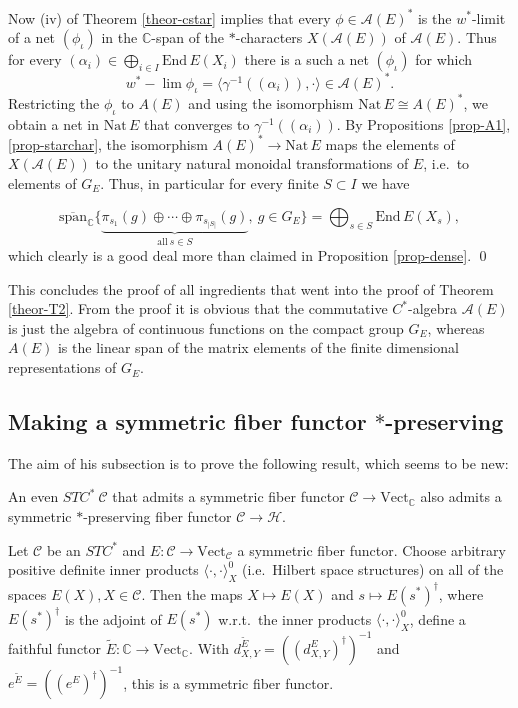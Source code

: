 \documentclass[12pt]{article}
\theoremstyle{definition}
\theoremstyle{definition}
\theoremstyle{remark}
\newcommand{\Vect}{\mathrm{Vect}}
\def\2#1{{\mathcal #1}}
\def\7#1{{\mathbb #1}}
\newcommand{\End}{\mathrm{End}}
\newcommand{\rarr}{\rightarrow}
\newcommand{\Nat}{\mathrm{Nat}}
\begin{document}
Now (iv) of Theorem \ref{theor-cstar} implies that every $\phi\in\2A(E)^*$ is the $w^*$-limit of a
net $(\phi_\iota)$ in the $\7C$-span of the $*$-characters $X(\2A(E))$ of $\2A(E)$.  Thus for every 
$(\alpha_i)\in\bigoplus_{i\in I}\End\,E(X_i)$ there is a such a net $(\phi_\iota)$ for which
\[ w^*-\lim \phi_\iota =
\langle\gamma^{-1}((\alpha_i)),\cdot\rangle\in\2A(E)^*. \] Restricting
the $\phi_\iota$ to $A(E)$ and using the isomorphism $\Nat\,E\cong
A(E)^*$, we obtain a net in $\Nat\,E$ that converges to
$\gamma^{-1}((\alpha_i))$. By Propositions \ref{prop-A1},
\ref{prop-starchar}, the isomorphism $A(E)^*\rarr\Nat\,E$ maps the
elements of $X(\2A(E))$ to the unitary natural monoidal
transformations of $E$, i.e.\ to elements of $G_E$.  Thus, in
particular for every finite $S\subset I$ we have

\[ \overline{\mathrm{span}} _{\7C} \{
  \underbrace{ \pi_{s_1}(g)\oplus\cdots\oplus\pi_{s_{|S|}}(g)}_{\mathrm{all}\
    s\in S},\ g\in G_E \}  = \bigoplus_{s\in S}\End\,E(X_s), \]
which clearly is a good deal more than claimed in Proposition
\ref{prop-dense}.  \qed

This concludes the proof of all ingredients that went into the proof
of Theorem \ref{theor-T2}. From the proof it is obvious that the
commutative $C^*$-algebra $\2A(E)$ is just the algebra of continuous
functions on the compact group $G_E$, whereas $A(E)$ is the linear
span of the matrix elements of the finite dimensional representations
of $G_E$.




\subsection{Making a symmetric fiber functor $*$-preserving} \label{ss-starpres}
The aim of his subsection is to prove the following result, which seems to be new:

\btheor \label{theor-F} An even $STC^*\ \2C$ that admits a symmetric
fiber functor $\2C\rarr\Vect_\7C$ also admits a symmetric
$*$-preserving fiber functor $\2C\rarr\2H$.  \etheor

\blemma Let $\2C$ be an $STC^*$ and $E:\2C\rarr\Vect_\2C$ a symmetric
fiber functor. Choose arbitrary positive definite inner products
$\langle\cdot,\cdot\rangle^0_X$ (i.e.\ Hilbert space structures) on
all of the spaces $E(X), X\in\2C$. Then the maps $X\mapsto E(X)$ and
$s\mapsto E(s^*)^\dagger$, where $E(s^*)^\dagger$ is the adjoint of
$E(s^*)$ w.r.t.\ the inner products $\langle\cdot,\cdot\rangle^0_X$,
define a faithful functor $\widetilde{E}:\7C\rarr\Vect_\7C$. With
$d^{\widetilde{E}}_{X,Y}=((d^E_{X,Y})^\dagger)^{-1}$ and
$e^{\widetilde{E}}=((e^E)^\dagger)^{-1}$, this is a symmetric fiber
functor.  \elemma
\end{document}
